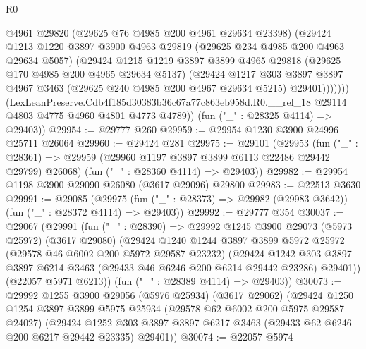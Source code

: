 \begin{lexlean}{R0}
\begin{coremodule}
                @4961
                @29820
                (@29625 @76 @4985 @200 @4961 @29634 @23398)
                (@29424
                  @1213
                  @1220
                  @3897
                  @3900
                  @4963
                  @29819
                  (@29625 @234 @4985 @200 @4963 @29634 @5057)
                  (@29424
                    @1215
                    @1219
                    @3897
                    @3899
                    @4965
                    @29818
                    (@29625 @170 @4985 @200 @4965 @29634 @5137)
                    (@29424
                      @1217
                      @303
                      @3897
                      @3897
                      @4967
                      @3463
                      (@29625 @240 @4985 @200 @4967 @29634 @5215)
                      @29401)))))))
        (LexLeanPreserve.Cdb4f185d30383b36c67a77c863eb958d.R0.__rel_18
          @29114
          @4803
          @4775
          @4960
          @4801
          @4773
          @4789))
      (fun ("_" : @28325 @4114) => @29403))
@29954 := @29777 @260
@29959 := @29954 @1230 @3900 @24996 @25711 @26064
@29960 := @29424 @281
@29975 := @29101
    (@29953
      (fun ("_" : @28361) => @29959 (@29960 @1197 @3897 @3899 @6113 @22486 @29442 @29799) @26068)
      (fun ("_" : @28360 @4114) => @29403))
@29982 := @29954 @1198 @3900 @29090 @26080 (@3617 @29096) @29800
@29983 := @22513 @3630
@29991 := @29085
    (@29975 (fun ("_" : @28373) => @29982 (@29983 @3642)) (fun ("_" : @28372 @4114) => @29403))
@29992 := @29777 @354
@30037 := @29067
    (@29991
      (fun ("_" : @28390) =>
      @29992
        @1245
        @3900
        @29073
        (@5973 @25972)
        (@3617 @29080)
        (@29424
          @1240
          @1244
          @3897
          @3899
          @5972
          @25972
          (@29578 @46 @6002 @200 @5972 @29587 @23232)
          (@29424
            @1242
            @303
            @3897
            @3897
            @6214
            @3463
            (@29433 @46 @6246 @200 @6214 @29442 @23286)
            @29401))
        (@22057 @5971 @6213))
      (fun ("_" : @28389 @4114) => @29403))
@30073 := @29992
    @1255
    @3900
    @29056
    (@5976 @25934)
    (@3617 @29062)
    (@29424
      @1250
      @1254
      @3897
      @3899
      @5975
      @25934
      (@29578 @62 @6002 @200 @5975 @29587 @24027)
      (@29424
        @1252
        @303
        @3897
        @3897
        @6217
        @3463
        (@29433 @62 @6246 @200 @6217 @29442 @23335)
        @29401))
@30074 := @22057 @5974

\end{coremodule}
\end{lexlean}
